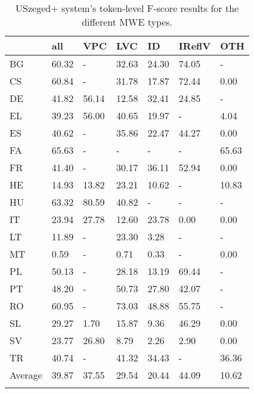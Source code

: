 \documentclass[output=paper,modfonts]{langscibook}
\begin{document}
\begin{table}
\centering
\caption{USzeged+ system's token-level F-score results for the different MWE types.}
\label{tokenlevel}
\begin{tabular}{lllllll}
  \lsptoprule
  & all   & VPC    & LVC    & ID     & IReflV & OTH    \\
 \midrule
BG  & 60.32 &  -       & 32.63 & 24.30 & 74.05 &  -     \\
CS  & 60.84 &  -       & 31.78 & 17.87 & 72.44 & 0.00\\
DE  & 41.82 & 56.14 & 12.58 & 32.41 & 24.85 &  -     \\
EL  & 39.23 & 56.00 & 40.65 & 19.97 &  -       & 4.04\\
ES  & 40.62 &  -       & 35.86 & 22.47 & 44.27 & 0.00\\
FA  & 65.63 &  -       &  -       &  -       &  -       & 65.63\\
FR  & 41.40 &  -       & 30.17 & 36.11 & 52.94 & 0.00\\
HE  & 14.93 & 13.82 & 23.21 & 10.62 &  -       & 10.83\\
HU  & 63.32 & 80.59 & 40.82 &  -       &  -       &  -     \\
IT  & 23.94 & 27.78 & 12.60 & 23.78 & 0.00 & 0.00\\
LT  & 11.89 &  -       & 23.30 & 3.28 &  -       &  -     \\
MT  & 0.59 &  -       & 0.71 & 0.33 &  -       & 0.00\\
PL  & 50.13 &  -       & 28.18 & 13.19 & 69.44 &  -     \\
PT  & 48.20 &  -       & 50.73 & 27.80 & 42.07 &  -     \\
RO  & 60.95 &  -       & 73.03 & 48.88 & 55.75 &  -     \\
SL  & 29.27 & 1.70 & 15.87 & 9.36 & 46.29 & 0.00\\
SV  & 23.77 & 26.80 & 8.79 & 2.26 & 2.90 & 0.00\\
TR  & 40.74 &  -       & 41.32 & 34.43 &  -       & 36.36\\
\midrule
Average  & 39.87 & 37.55 & 29.54 & 20.44 & 44.09 & 10.62\\



  \lspbottomrule
\end{tabular}
\end{table}
\end{document}
